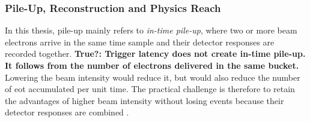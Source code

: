 \subsubsection{Pile-Up, Reconstruction and Physics Reach}
\label{sec:formalism}











In this thesis, \gls{pile-up} mainly refers to \emph{in-time pile-up}, where
two or more beam electrons arrive in the same time sample and their detector
responses are recorded together. 
\textbf{True?: Trigger latency does not create in-time pile-up. It follows from the number of electrons delivered in the same bucket.}
Lowering the beam intensity would reduce it, but would also
reduce the number of \gls{eot} accumulated per unit time. The practical
challenge is therefore to retain the advantages of higher beam intensity
without losing events because their detector responses are combined
\cite{ldmx2025-overview}.

